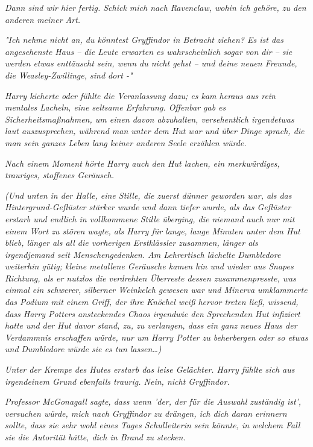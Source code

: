 {\emph{Dann sind wir hier fertig. Schick mich nach Ravenclaw, wohin ich gehöre, zu den anderen meiner Art.}

\emph{"Ich nehme nicht an, du könntest Gryffindor in Betracht ziehen? Es ist das angesehenste Haus -- die Leute erwarten es wahrscheinlich sogar von dir -- sie werden etwas enttäuscht sein, wenn du nicht gehst -- und deine neuen Freunde, die Weasley-Zwillinge, sind dort -"}

\emph{Harry kicherte oder fühlte die Veranlassung dazu; es kam heraus aus rein mentales Lacheln, eine seltsame Erfahrung. Offenbar gab es Sicherheitsmaßnahmen, um einen davon abzuhalten, versehentlich irgendetwas laut auszusprechen, während man unter dem Hut war und über Dinge sprach, die man sein ganzes Leben lang keiner anderen Seele erzählen würde.}

\emph{Nach einem Moment hörte Harry auch den Hut lachen, ein merkwürdiges, trauriges, stoffenes Geräusch.}

\emph{(Und unten in der Halle, eine Stille, die zuerst dünner geworden war, als das Hintergrund-Geflüster stärker wurde und dann tiefer wurde, als das Geflüster erstarb und endlich in vollkommene Stille überging, die niemand} \emph{auch nur mit einem Wort zu stören wagte, als Harry für lange, lange Minuten unter dem Hut blieb, länger als all die vorherigen Erstklässler zusammen, länger als irgendjemand seit Menschengedenken. Am Lehrertisch lächelte Dumbledore weiterhin gütig; kleine metallene Geräusche kamen hin und wieder aus Snapes Richtung, als er nutzlos die verdrehten Überreste dessen zusammenpresste, was einmal ein schwerer, silberner Weinkelch gewesen war und Minerva umklammerte das Podium mit einem Griff, der ihre Knöchel weiß hervor treten ließ, wissend, dass Harry Potters ansteckendes Chaos irgendwie den Sprechenden Hut infiziert hatte und der Hut davor stand, zu, zu verlangen, dass ein ganz neues Haus der Verdammnis erschaffen würde, nur um Harry Potter zu beherbergen oder so etwas und} \emph{\emph{Dumbledore würde sie es tun lassen…)}}

\emph{Unter der Krempe des Hutes erstarb das leise Gelächter. Harry fühlte sich aus irgendeinem Grund ebenfalls traurig. Nein, nicht Gryffindor.}

\emph{\emph{Professor McGonagall sagte, dass wenn 'der, der für die Auswahl zuständig ist', versuchen würde, mich nach Gryffindor zu drängen, ich dich daran erinnern sollte, dass sie sehr wohl eines Tages Schulleiterin sein könnte, in welchem Fall sie die Autorität hätte, dich in Brand zu stecken.}}

}
